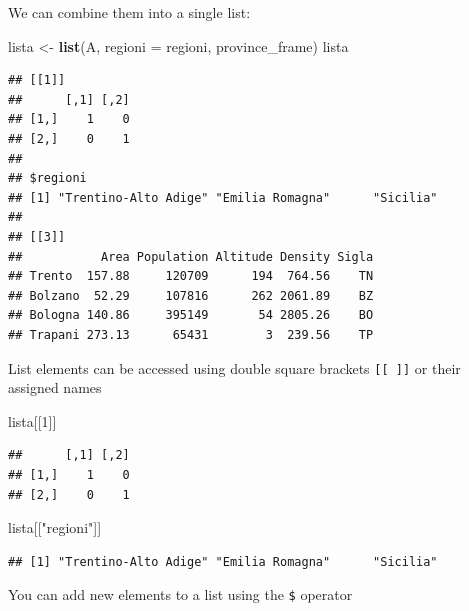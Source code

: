 \documentclass[
]{article}
\newenvironment{Shaded}{\begin{snugshade}}{\end{snugshade}}
\newcommand{\AttributeTok}[1]{\textcolor[rgb]{0.13,0.29,0.53}{#1}}
\newcommand{\DecValTok}[1]{\textcolor[rgb]{0.00,0.00,0.81}{#1}}
\newcommand{\FunctionTok}[1]{\textcolor[rgb]{0.13,0.29,0.53}{\textbf{#1}}}
\newcommand{\NormalTok}[1]{#1}
\newcommand{\OtherTok}[1]{\textcolor[rgb]{0.56,0.35,0.01}{#1}}
\newcommand{\SpecialCharTok}[1]{\textcolor[rgb]{0.81,0.36,0.00}{\textbf{#1}}}
\newcommand{\StringTok}[1]{\textcolor[rgb]{0.31,0.60,0.02}{#1}}
\begin{document}
We can combine them into a single list:

\begin{Shaded}
\begin{Highlighting}[]
\NormalTok{lista }\OtherTok{\textless{}{-}} \FunctionTok{list}\NormalTok{(A, }\AttributeTok{regioni =}\NormalTok{ regioni, province\_frame)}
\NormalTok{lista}
\end{Highlighting}
\end{Shaded}

\begin{verbatim}
## [[1]]
##      [,1] [,2]
## [1,]    1    0
## [2,]    0    1
## 
## $regioni
## [1] "Trentino-Alto Adige" "Emilia Romagna"      "Sicilia"            
## 
## [[3]]
##           Area Population Altitude Density Sigla
## Trento  157.88     120709      194  764.56    TN
## Bolzano  52.29     107816      262 2061.89    BZ
## Bologna 140.86     395149       54 2805.26    BO
## Trapani 273.13      65431        3  239.56    TP
\end{verbatim}

List elements can be accessed using double square brackets
\texttt{{[}{[}\ {]}{]}} or their assigned names

\begin{Shaded}
\begin{Highlighting}[]
\NormalTok{lista[[}\DecValTok{1}\NormalTok{]]}
\end{Highlighting}
\end{Shaded}

\begin{verbatim}
##      [,1] [,2]
## [1,]    1    0
## [2,]    0    1
\end{verbatim}

\begin{Shaded}
\begin{Highlighting}[]
\NormalTok{lista[[}\StringTok{"regioni"}\NormalTok{]]}
\end{Highlighting}
\end{Shaded}

\begin{verbatim}
## [1] "Trentino-Alto Adige" "Emilia Romagna"      "Sicilia"
\end{verbatim}

You can add new elements to a list using the \texttt{\$} operator

\begin{Shaded}
\end{Shaded}
\end{document}

